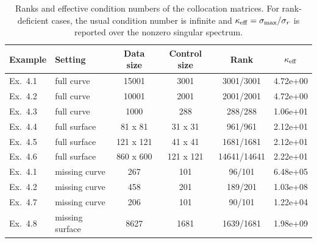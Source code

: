 \begin{table}[H]
\centering
\caption{Ranks and effective condition numbers of the collocation matrices. For rank-deficient cases, the usual condition number is infinite and $\kappa_{\rm eff}=\sigma_{\max}/\sigma_r$ is reported over the nonzero singular spectrum.}
\label{tab:condition_numbers}
\begin{tabular}{llcccc}
\hline
Example & Setting & Data size & Control size & Rank & $\kappa_{\rm eff}$ \\
\hline
Ex.~4.1 & full curve & 15001 & 3001 & 3001/3001 & 4.72e+00 \\
Ex.~4.2 & full curve & 10001 & 2001 & 2001/2001 & 4.72e+00 \\
Ex.~4.3 & full curve & 1000 & 288 & 288/288 & 1.06e+01 \\
Ex.~4.4 & full surface & 81 x 81 & 31 x 31 & 961/961 & 2.12e+01 \\
Ex.~4.5 & full surface & 121 x 121 & 41 x 41 & 1681/1681 & 2.12e+01 \\
Ex.~4.6 & full surface & 860 x 600 & 121 x 121 & 14641/14641 & 2.22e+01 \\
Ex.~4.1 & missing curve & 267 & 101 & 96/101 & 6.48e+05 \\
Ex.~4.2 & missing curve & 458 & 201 & 189/201 & 1.03e+08 \\
Ex.~4.7 & missing curve & 206 & 101 & 90/101 & 1.22e+04 \\
Ex.~4.8 & missing surface & 8627 & 1681 & 1639/1681 & 1.98e+09 \\
\hline
\end{tabular}
\end{table}
